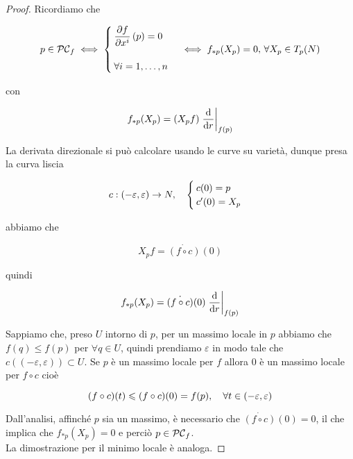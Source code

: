 \begin{proof}
	Ricordiamo che
	
	\begin{equation}
		p \in \PC_{f} %
		\iff %
		\begin{cases}
			\dpdv{f}{x^{i}} \, (p) = 0\\\\
			\forall i=1,\dots,n
		\end{cases} %
		\iff %
		f_{*p}(X_{p}) = 0, \, \forall X_{p} \in T_{p}(N)
	\end{equation}

	con
	
	\begin{equation}
		f_{*p}(X_{p}) = (X_{p} f) \eval{ \dv{r} }_{f(p)}
	\end{equation}
	
	La derivata direzionale si può calcolare usando le curve su varietà, dunque presa la curva liscia
				
	\begin{equation}
		c : (-\varepsilon,\varepsilon) \to N \qcomma %
		\begin{cases}
			c(0) = p\\
			c'(0) = X_{p}
		\end{cases}
	\end{equation}

	abbiamo che
	
	\begin{equation}
		X_{p} f = \dot{(f \circ c)}(0)
	\end{equation}
	
	quindi
	
	\begin{equation}
		f_{*p}(X_{p}) = \dot{(f \circ c)}(0) \eval{ \dv{r} }_{f(p)}
	\end{equation}
	
	Sappiamo che, preso $ U $ intorno di $ p $, per un massimo locale in $ p $ abbiamo che $ f(q) \leqslant f(p) $ per $ \forall q \in U $, quindi prendiamo $ \varepsilon $ in modo tale che $ c((-\varepsilon,\varepsilon)) \subset U $. Se $ p $ è un massimo locale per $ f $ allora 0 è un massimo locale per $ f \circ c $ cioè
	
	\begin{equation}
		(f \circ c)(t) \leqslant (f \circ c)(0) = f(p) \qcomma \forall t \in (-\varepsilon,\varepsilon)
	\end{equation}

	Dall'analisi, affinché $ p $ sia un massimo, è necessario che $ \dot{(f \circ c)}(0) = 0 $, il che implica che $ f_{*p}(X_{p}) = 0 $ e perciò $ p \in \mathcal{PC}_{f} $.\\	
	La dimostrazione per il minimo locale è analoga.
\end{proof}

